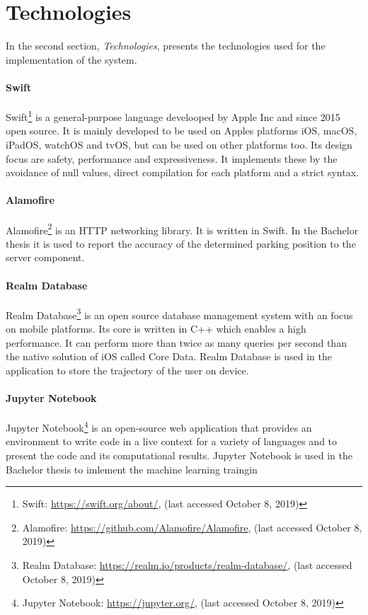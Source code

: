 \section{Technologies}
In the second section, \textit{Technologies}, presents the technologies used for the implementation of the system.

\paragraph{Swift} Swift\footnote{Swift: \url{https://swift.org/about/}, (last accessed October 8, 2019)} is a general-purpose language develooped by Apple Inc and since 2015 open source. It is mainly developed to be used on Apples platforms iOS, macOS, iPadOS, watchOS and tvOS, but can be used on other platforms too. Its design focus are safety, performance and expressiveness. It implements these by the avoidance of null values, direct compilation for each platform and a strict syntax. \cite{apple:swift}

\paragraph{Alamofire} Alamofire\footnote{Alamofire: \url{https://github.com/Alamofire/Alamofire}, (last accessed October 8, 2019)} is an HTTP networking library. It is written in Swift. In the Bachelor thesis it is used to report the accuracy of the determined parking position to the server component. \cite{alamofire}

\paragraph{Realm Database} Realm Database\footnote{Realm Database: \url{https://realm.io/products/realm-database/}, (last accessed October 8, 2019)} is an open source database management system with an focus on mobile platforms. Its core is written in C++ which enables a high performance. It can perform more than twice as many queries per second than the native solution of iOS called Core Data.  Realm Database is used in the application to store the trajectory of the user on device. \cite{realm}

\paragraph{Jupyter Notebook} Jupyter Notebook\footnote{Jupyter Notebook: \url{https://jupyter.org/}, (last accessed October 8, 2019)} is an open-source web application that provides an environment to write code in a live context for a variety of languages and to present the code and its computational results. Jupyter Notebook is used in the Bachelor thesis to imlement the machine learning traingin \cite{jupyter}

